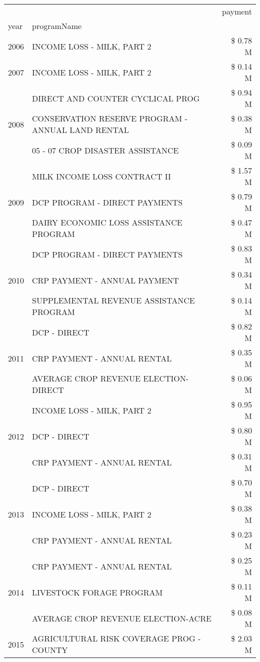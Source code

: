 \begin{tabular}{llr}
\toprule
 &  & payment \\
year & programName &  \\
\midrule
2006 & INCOME LOSS - MILK, PART 2 & \$ 0.78 M \\
\cline{1-3}
2007 & INCOME LOSS - MILK, PART 2 & \$ 0.14 M \\
\cline{1-3}
\multirow[t]{3}{*}{2008} & DIRECT AND COUNTER CYCLICAL PROG & \$ 0.94 M \\
 & CONSERVATION RESERVE PROGRAM - ANNUAL LAND RENTAL & \$ 0.38 M \\
 & 05 - 07 CROP DISASTER ASSISTANCE & \$ 0.09 M \\
\cline{1-3}
\multirow[t]{3}{*}{2009} & MILK INCOME LOSS CONTRACT II & \$ 1.57 M \\
 & DCP PROGRAM - DIRECT PAYMENTS & \$ 0.79 M \\
 & DAIRY ECONOMIC LOSS ASSISTANCE PROGRAM & \$ 0.47 M \\
\cline{1-3}
\multirow[t]{3}{*}{2010} & DCP PROGRAM - DIRECT PAYMENTS & \$ 0.83 M \\
 & CRP PAYMENT - ANNUAL PAYMENT & \$ 0.34 M \\
 & SUPPLEMENTAL REVENUE ASSISTANCE PROGRAM & \$ 0.14 M \\
\cline{1-3}
\multirow[t]{3}{*}{2011} & DCP - DIRECT & \$ 0.82 M \\
 & CRP PAYMENT - ANNUAL RENTAL & \$ 0.35 M \\
 & AVERAGE CROP REVENUE ELECTION-DIRECT & \$ 0.06 M \\
\cline{1-3}
\multirow[t]{3}{*}{2012} & INCOME LOSS - MILK, PART 2 & \$ 0.95 M \\
 & DCP - DIRECT & \$ 0.80 M \\
 & CRP PAYMENT - ANNUAL RENTAL & \$ 0.31 M \\
\cline{1-3}
\multirow[t]{3}{*}{2013} & DCP - DIRECT & \$ 0.70 M \\
 & INCOME LOSS - MILK, PART 2 & \$ 0.38 M \\
 & CRP PAYMENT - ANNUAL RENTAL & \$ 0.23 M \\
\cline{1-3}
\multirow[t]{3}{*}{2014} & CRP PAYMENT - ANNUAL RENTAL & \$ 0.25 M \\
 & LIVESTOCK FORAGE PROGRAM & \$ 0.11 M \\
 & AVERAGE CROP REVENUE ELECTION-ACRE & \$ 0.08 M \\
\cline{1-3}
\multirow[t]{3}{*}{2015} & AGRICULTURAL RISK COVERAGE PROG - COUNTY & \$ 2.03 M \\

\end{tabular}
